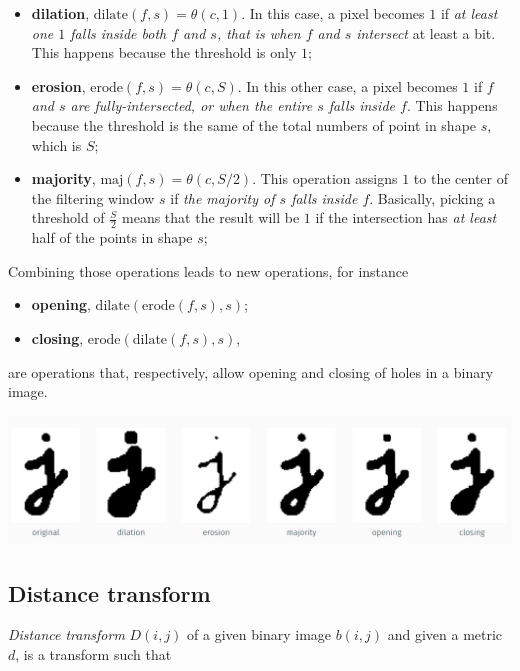 \documentclass[10pt]{report}
\begin{document}
\begin{itemize}
\item \textbf{dilation}, \(\mbox{dilate}(f, s) = \theta(c, 1)\). In this case, a
pixel becomes \(1\) if \emph{at least one \(1\) falls inside both \(f\) and
\(s\), that is when \(f\) and \(s\) intersect} at least a bit. This
happens because the threshold is only \(1\);
\item \textbf{erosion}, \(\mbox{erode}(f, s) = \theta(c, S)\). In this other case,
a pixel becomes \(1\) if \emph{\(f\) and \(s\) are fully-intersected, or
when the entire \(s\) falls inside \(f\)}. This happens because the
threshold is the same of the total numbers of point in shape \(s\),
which is \(S\);
\item \textbf{majority}, \(\mbox{maj}(f, s) = \theta(c, S/2)\).
This operation assigns \(1\) to the center of the filtering window
\(s\) if \emph{the majority of \(s\) falls inside \(f\)}. Basically,
picking a threshold of \(\frac{S}{2}\) means that the result will be
\(1\) if the intersection has \emph{at least} half of the points in shape
\(s\);
\end{itemize}

Combining those operations leads to new operations, for instance

\begin{itemize}
\item \textbf{opening}, \(\mbox{dilate}(\mbox{erode}(f, s), s)\);
\item \textbf{closing}, \(\mbox{erode}(\mbox{dilate}(f, s), s)\),
\end{itemize}

are operations that, respectively, allow opening and closing of holes in
a binary image.

\begin{center}
\includegraphics[width=.9\linewidth]{./pics/proc/morphological-operations.jpg}
\end{center}

\subsection{Distance transform}
\label{distance-transform}
\emph{Distance transform} \(D(i, j)\) of a given binary image \(b(i, j)\) and
given a metric \(d\), is a transform such that
\end{document}
